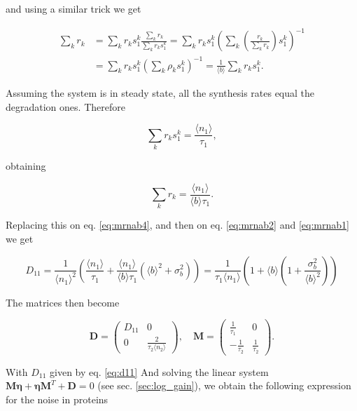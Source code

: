 and using a similar trick we get

\begin{equation*}
  \begin{split}
    \sum_kr_k&=\sum_kr_ks_1^k\frac{\sum_kr_k}{\sum_kr_ks_1^k}=\sum_kr_ks_1^k\left(\sum_k\left(\frac{r_k}{\sum_kr_k}\right)s_1^k\right)^{-1}\\
    &=\sum_kr_ks_1^k\left(\sum_k\rho_ks_1^k\right)^{-1}=\frac{1}{\langle b\rangle}\sum_kr_ks_1^k.
  \end{split}
\end{equation*}

Assuming the system is in steady state, all the synthesis rates equal the degradation ones. Therefore

\begin{equation*}
  \sum_kr_ks_1^k = \frac{\langle n_1\rangle}{\tau_1},
\end{equation*}

obtaining

\begin{equation*}
   \sum_kr_k = \frac{\langle n_1\rangle}{\langle b\rangle\tau_1}.
\end{equation*}

Replacing this on eq. \eqref{eq:mrnab4}, and then on eq. \eqref{eq:mrnab2} and \eqref{eq:mrnab1} we get

\begin{equation}
  \label{eq:d11}
  D_{11}=\frac{1}{\langle n_1\rangle^2}\left(\frac{\langle n_1\rangle}{\tau_1}+\frac{\langle n_1\rangle}{\langle b\rangle\tau_1}\left(\langle b\rangle^2+\sigma_b^2\right)\right) = \frac{1}{\tau_1\langle n_1\rangle}\left( 1+ \langle b\rangle\left(1+\frac{\sigma_b^2}{\langle b\rangle^2}\right)\right)
\end{equation}

The matrices then become

\begin{equation*}
  \mathbf{D} = 
  \begin{pmatrix}
    D_{11} & 0 \\
    0 & \frac{2}{\tau_2\langle n_2\rangle}
  \end{pmatrix}, \quad
  \mathbf{M} =
  \begin{pmatrix}
    \frac{1}{\tau_1} & 0 \\
    -\frac{1}{\tau_2} & \frac{1}{\tau_2}
  \end{pmatrix}.
\end{equation*}

With $D_{11}$ given by eq. \eqref{eq:d11} And solving the linear system $\mathbf{M}\mathbf{\eta} + \mathbf{\eta M}^T+\mathbf{D}=0$ (see sec. \ref{sec:log_gain}), we obtain the following expression for the noise in proteins


